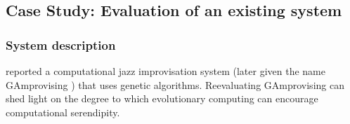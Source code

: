 
\subsection{Case Study: Evaluation of an existing system} \label{sec:evomusic}

\subsubsection{System description}

 reported a computational jazz improvisation system
(later given the name {\sf GAmprovising} \cite{jordanous:12}) that
uses genetic algorithms.  Reevaluating {\sf GAmprovising} can shed
light on the degree to which evolutionary computing can encourage
computational serendipity.

